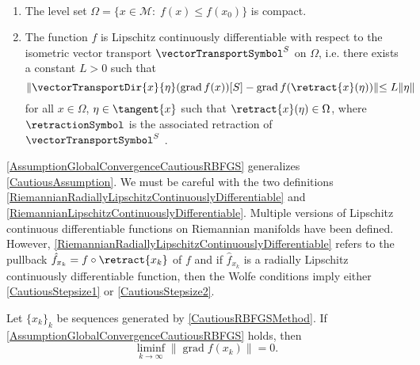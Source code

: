 \begin{assumption}\label{AssumptionGlobalConvergenceCautiousRBFGS} \ \\[-1.5\baselineskip]
    \begin{enumerate}
        \item The level set $\Omega = \{x \in \mathcal{M} \colon \; f(x) \leq f(x_0) \}$ is compact.
        \item The function $f$ is Lipschitz continuously differentiable with respect to the isometric vector transport $\vectorTransportSymbol^S$ on $\Omega$, i.e. there exists a constant $L > 0$ such that \begin{equation} \lVert \vectorTransportDir{x}{\eta}(\operatorname{grad} f(x))[S] - \operatorname{grad} f (\retract{x}(\eta)) \lVert \leq L \lVert \eta \rVert \label{RiemannianLipschitzContinuouslyDifferentiable} \end{equation} for all $x \in \Omega$, $\eta \in \tangent{x}$ such that $\retract{x}(\eta) \in \Omega$, where $\retractionSymbol$ is the associated retraction of $\vectorTransportSymbol^S$ \cite[Definition~4.1.]{HuangAbsilGallivan:2018}.
    \end{enumerate}
\end{assumption}

\cref{AssumptionGlobalConvergenceCautiousRBFGS} generalizes \cref{CautiousAssumption}. We must be careful with the two definitions \cref{RiemannianRadiallyLipschitzContinuouslyDifferentiable} and \cref{RiemannianLipschitzContinuouslyDifferentiable}. Multiple versions of Lipschitz continuous differentiable functions on Riemannian manifolds have been defined. However, \cref{RiemannianRadiallyLipschitzContinuouslyDifferentiable} refers to the pullback $\hat{f}_{x_k} = f \circ \retract{x_k}$ of $f$ and if $\hat{f}_{x_k}$ is a radially Lipschitz continuously differentiable function, then the Wolfe conditions imply either \cref{CautiousStepsize1} or \cref{CautiousStepsize2}.

\begin{theorem} 
    Let $\{ x_k \}_k$ be sequences generated by \cref{CautiousRBFGSMethod}. If \cref{AssumptionGlobalConvergenceCautiousRBFGS} holds, then
    \begin{equation*}
        \liminf_{k \to \infty} \lVert \operatorname{grad} f(x_k) \rVert = 0.
    \end{equation*}
\end{theorem}

